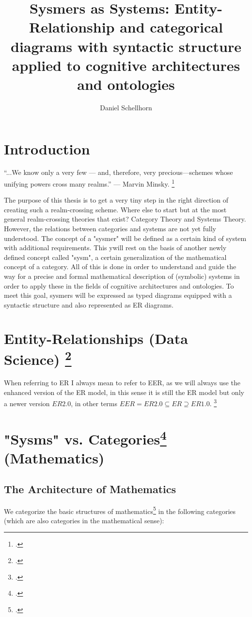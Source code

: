 \documentclass[12pt,a4paper]{article}
\title{Sysmers as Systems: Entity-Relationship and categorical diagrams with syntactic structure applied to cognitive architectures and ontologies}
\author{Daniel Schellhorn}
\begin{document}
\maketitle

\section*{Introduction}
“...We know only a very few — and, therefore, very precious—schemes whose unifying powers cross many realms.” — Marvin Minsky. \footcite[?]{Minsky1988}
\newline

The purpose of this thesis is to get a very tiny step in the right direction of creating such a realm-crossing scheme.  Where else to start but at the most general realm-crossing theories that exist? Category Theory and Systems Theory. However, the relations between categories and systems are not yet fully understood. The concept of a "sysmer" will be defined as a certain kind of system with additional requirements. This ywill rest on the basis of another newly defined concept called "sysm", a certain generalization of the mathematical concept of a category. All of this is done in order to understand and guide the way for a precise and formal mathematical description of (symbolic) systems in order to apply these in the fields of cognitive architectures and ontologies. To meet this goal, sysmers will be expressed as typed diagrams equipped with a syntactic structure and also represented as ER diagrams.
\section{Entity-Relationships (Data Science) \footcite{ElmasriNavathe2015}}

When referring to ER I always mean to refer to EER, as we will always use the enhanced version of the ER model, in this sense it is still the ER model but only a newer version $ER 2.0$, in other terms $EER = ER 2.0 \subseteq ER \supseteq ER 1.0 $. \footcite[107]{ElmasriNavathe2015}

\section{"Sysms" vs. Categories\footcite{MacLane1997} (Mathematics)}

\subsection{The Architecture of Mathematics}
We categorize the basic structures of mathematics\footcite[68]{Basieux2000} in the following categories (which are also categories in the mathematical sense):
\end{document}
